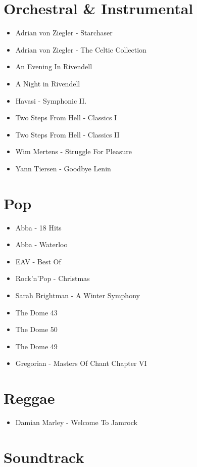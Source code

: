 \section{Orchestral \& Instrumental}

\begin{itemize}
	\item Adrian von Ziegler - Starchaser
	\item Adrian von Ziegler - The Celtic Collection
	\item An Evening In Rivendell 
	\item A Night in Rivendell
	\item Havasi - Symphonic II.
	\item Two Steps From Hell - Classics I
	\item Two Steps From Hell - Classics II
	\item Wim Mertens - Struggle For Pleasure
	\item Yann Tiersen - Goodbye Lenin
\end{itemize}

\section{Pop}

\begin{itemize}
	\item Abba - 18 Hits
	\item Abba - Waterloo
	\item EAV - Best Of
	\item Rock'n'Pop - Christmas
	\item Sarah Brightman - A Winter Symphony
	\item The Dome 43
	\item The Dome 50
	\item The Dome 49
	\item Gregorian - Masters Of Chant Chapter VI
\end{itemize}

\section{Reggae}

\begin{itemize}
	\item Damian Marley - Welcome To Jamrock
\end{itemize}

\section{Soundtrack}

